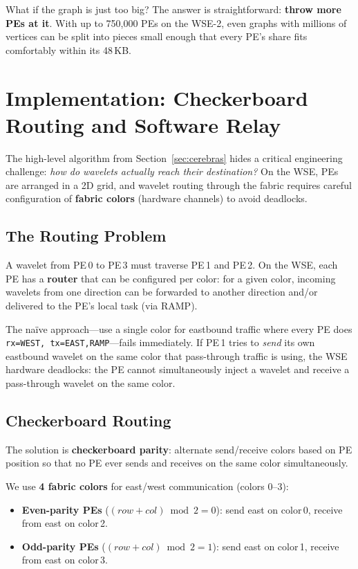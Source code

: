 \documentclass[11pt,letterpaper]{article}
\begin{document}
What if the graph is just too big? The answer is straightforward: \textbf{throw more PEs at it}. With up to 750,000 PEs on the WSE-2, even graphs with millions of vertices can be split into pieces small enough that every PE's share fits comfortably within its 48\,KB.

\section{Implementation: Checkerboard Routing and Software Relay}
\label{sec:implementation}

The high-level algorithm from Section~\ref{sec:cerebras} hides a critical engineering challenge: \emph{how do wavelets actually reach their destination?} On the WSE, PEs are arranged in a 2D grid, and wavelet routing through the fabric requires careful configuration of \textbf{fabric colors} (hardware channels) to avoid deadlocks.

\subsection{The Routing Problem}

A wavelet from PE\,0 to PE\,3 must traverse PE\,1 and PE\,2. On the WSE, each PE has a \textbf{router} that can be configured per color: for a given color, incoming wavelets from one direction can be forwarded to another direction and/or delivered to the PE's local task (via RAMP).

The na\"ive approach---use a single color for eastbound traffic where every PE does \texttt{rx=WEST, tx=EAST,RAMP}---fails immediately. If PE\,1 tries to \emph{send} its own eastbound wavelet on the same color that pass-through traffic is using, the WSE hardware deadlocks: the PE cannot simultaneously inject a wavelet and receive a pass-through wavelet on the same color.

\subsection{Checkerboard Routing}

The solution is \textbf{checkerboard parity}: alternate send/receive colors based on PE position so that no PE ever sends and receives on the same color simultaneously.

We use \textbf{4 fabric colors} for east/west communication (colors 0--3):
\begin{itemize}[nosep]
  \item \textbf{Even-parity PEs} ($(row + col) \bmod 2 = 0$): send east on color\,0, receive from east on color\,2.
  \item \textbf{Odd-parity PEs} ($(row + col) \bmod 2 = 1$): send east on color\,1, receive from east on color\,3.
\end{itemize}
\end{document}
